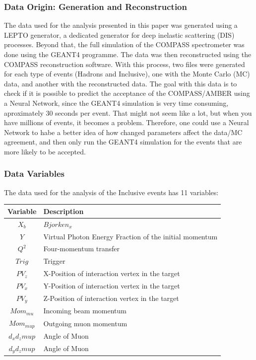 \documentclass{article}
\begin{document}
\subsubsection*{Data Origin: Generation and Reconstruction}
The data used for the analysis presented in this paper was generated using a LEPTO generator,
a dedicated generator for deep inelastic scattering (DIS) processes. Beyond that, the full simulation
of the COMPASS spectrometer was done using the GEANT4 programme. The data was then reconstructed
using the COMPASS reconstruction software. With this process, two files were generated for each type of events (Hadrons and Inclusive), one with the
Monte Carlo (MC) data, and another with the reconstructed data. 
The goal with this data is to check if it is possible to predict the acceptance of the COMPASS/AMBER
using a Neural Network, since the GEANT4 simulation is very time consuming, aproximately 30 seconds per event.
That might not seem like a lot, but when you have millions of events, it becomes a problem.
Therefore, one could use a Neural Network to habe a better idea of how changed parameters affect the data/MC
agreement, and then only run the GEANT4 simulation for the events that are more likely to be accepted.


\subsubsection*{Data Variables}
The data used for the analysis of the Inclusive events has 11 variables:

\begin{table}[H]
    \centering
    \begin{tabular}{c|l}
    \textbf{Variable} & \textbf{Description} \\ \hline
    $X_b$ & $Bjorken_x$ \\
    $Y$ & Virtual Photon Energy Fraction of the initial momentum\\
    $Q^2$ & Four-momentum transfer \\
    $Trig$ & Trigger \\
    $PV_z$ & X-Position of interaction vertex in the target\\
    $PV_x$ & Y-Position of interaction vertex in the target\\
    $PV_y$ & Z-Position of interaction vertex in the target\\
    $Mom_{mu}$ & Incoming beam momentum\\
    $Mom_{mup}$ & Outgoing muon momentum\\
    $d_xd_zmup$ & Angle of Muon \\
    $d_{y}d_{z}mup$ & Angle of Muon \\
    \end{tabular}
\end{table}
\end{document}
